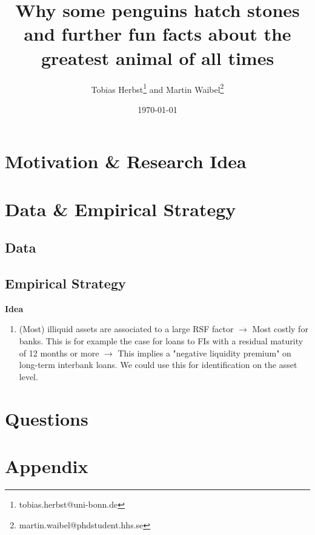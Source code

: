 \documentclass[a4paper,12pt]{article}
\title{Why some penguins hatch stones and further fun facts about the greatest animal of all times}
\author{Tobias Herbst\thanks{tobias.herbst@uni-bonn.de} and Martin Waibel\thanks{martin.waibel@phdstudent.hhs.se} }
\date{\today}
\begin{document}
\maketitle

\begin{abstract}
\lipsum[1-1]




\end{abstract}

\clearpage
\section{Motivation \& Research Idea}
\label{motivation}


\section{Data \& Empirical Strategy}
\label{data_strategy}

\subsection{Data}
\label{data}



\subsection{Empirical Strategy}
\label{emp_strategy}

\textbf{Idea}
\begin{enumerate}
	\item (Most) illiquid assets are associated to a large RSF factor $\rightarrow$ Most costly for banks. This is for example the case for loans to FIs with a residual maturity of 12 months or more $\rightarrow$ This implies a "negative liquidity premium" on long-term interbank loans. We could use this for identification on the asset level.

\end{enumerate}





\section{Questions}
\label{questions}


\clearpage

\section{Appendix}
\end{document}
